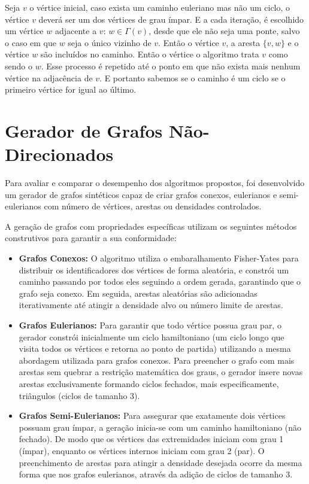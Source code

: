 \documentclass[12pt]{article}
\begin{document}
 Seja $v$ o vértice inicial, caso exista um caminho euleriano mas não um ciclo, o vértice $v$ deverá ser um dos vértices de grau ímpar. E a cada iteração, é escolhido um vértice $w$ adjacente a $v$: $w \in \Gamma(v)$, desde que ele não seja uma ponte, salvo o caso em que $w$ seja o único vizinho de $v$. Então o vértice $v$, a aresta $\{ v, w \}$ e o vértice $w$ são incluídos no caminho. Então o vértice o algoritmo trata $v$ como sendo o $w$. Esse processo é repetido até o ponto em que não exista mais nenhum vértice na adjacência de $v$. E portanto sabemos se o caminho é um ciclo se o primeiro vértice for igual ao último.

\section{Gerador de Grafos Não-Direcionados}

Para avaliar e comparar o desempenho dos algoritmos propostos, foi desenvolvido um gerador de grafos sintéticos capaz de criar grafos conexos, eulerianos e semi-eulerianos com número de vértices, arestas ou densidades controlados.

A geração de grafos com propriedades específicas utilizam os seguintes métodos construtivos para garantir a sua conformidade:

\begin{itemize}
    \item \textbf{Grafos Conexos:} O algoritmo utiliza o embaralhamento Fisher-Yates para distribuir os identificadores dos vértices de forma aleatória, e constrói um caminho passando por todos eles seguindo a ordem gerada, garantindo que o grafo seja conexo. Em seguida, arestas aleatórias são adicionadas iterativamente até atingir a densidade alvo ou número limite de arestas.
    \item \textbf{Grafos Eulerianos:} Para garantir que todo vértice possua grau par, o gerador constrói inicialmente um ciclo hamiltoniano (um ciclo longo que visita todos os vértices e retorna ao ponto de partida) utilizando a mesma abordagem utilizada para grafos conexos. Para preencher o grafo com mais arestas sem quebrar a restrição matemática dos graus, o gerador insere novas arestas exclusivamente formando ciclos fechados, mais especificamente, triângulos (ciclos de tamanho 3).
    \item \textbf{Grafos Semi-Eulerianos:} Para assegurar que exatamente dois vértices possuam grau ímpar, a geração inicia-se com um caminho hamiltoniano (não fechado). De modo que os vértices das extremidades iniciam com grau 1 (ímpar), enquanto os vértices internos iniciam com grau 2 (par). O preenchimento de arestas para atingir a densidade desejada ocorre da mesma forma que nos grafos eulerianos, através da adição de ciclos de tamanho 3.
\end{itemize}
\end{document}
